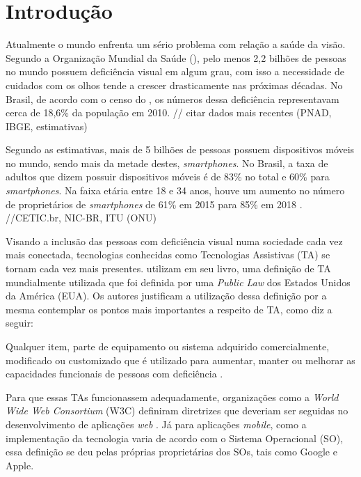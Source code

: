 \chapter{Introdução}

Atualmente o mundo enfrenta um sério problema com relação a saúde da visão. Segundo a Organização Mundial da Saúde (), pelo menos 2,2 bilhões de pessoas no mundo possuem deficiência visual em algum grau, com isso a necessidade de cuidados com os olhos tende a crescer drasticamente nas próximas décadas. No Brasil, de acordo com o censo do , os números dessa deficiência representavam cerca de 18,6\% da população em 2010. // citar dados mais recentes (PNAD, IBGE, estimativas)

Segundo  as estimativas, mais de 5 bilhões de pessoas possuem dispositivos móveis no mundo, sendo mais da metade destes, \textit{smartphones}. No Brasil, a taxa de adultos que dizem possuir dispositivos móveis é de 83\% no total e 60\% para \textit{smartphones}. Na faixa etária entre 18 e 34 anos, houve um aumento no número de proprietários de \textit{smartphones} de 61\% em 2015 para 85\% em 2018 \cite{Taylor2019}. //CETIC.br, NIC-BR, ITU (ONU)

Visando a inclusão das pessoas com deficiência visual numa sociedade cada vez mais conectada, tecnologias conhecidas como Tecnologias Assistivas (TA) se tornam cada vez mais presentes.  utilizam em seu livro, uma definição de TA mundialmente utilizada que foi definida por uma \textit{Public Law} dos Estados Unidos da América (EUA). Os autores justificam a utilização dessa definição por a mesma contemplar os pontos mais importantes a respeito de TA, como diz a seguir: 
\begin{citacao}
Qualquer item, parte de equipamento ou sistema adquirido comercialmente, modificado ou customizado que é utilizado para aumentar, manter ou melhorar as capacidades funcionais de pessoas com deficiência \cite{Cook2014}. 
\end{citacao}

Para que essas TAs funcionassem adequadamente, organizações como a \textit{World Wide Web Consortium} (W3C) definiram diretrizes que deveriam ser seguidas no desenvolvimento de aplicações \textit{web} \cite{W3C2019}. Já para aplicações \textit{mobile}, como a implementação da tecnologia varia de acordo com o Sistema Operacional (SO), essa definição se deu pelas próprias proprietárias dos SOs, tais como Google e Apple.

